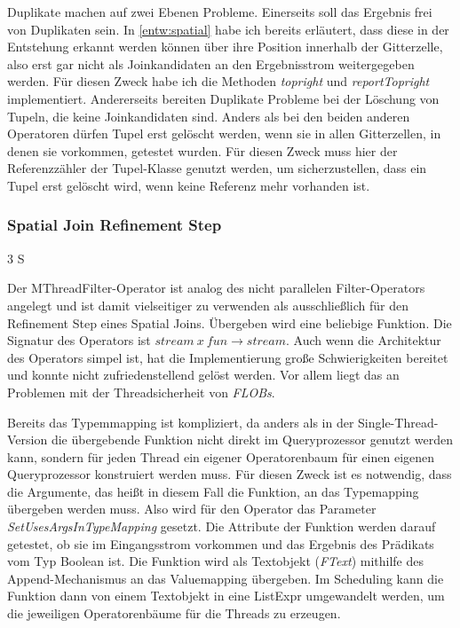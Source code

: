 \documentclass[a4paper,12pt,twoside]{article}
\newcommand{\Fb}[1]{\textit{#1}} %
\begin{document}
{Duplikate machen auf zwei Ebenen Probleme. Einerseits soll das Ergebnis frei von Duplikaten sein. In \autoref{entw:spatial} habe ich bereits erläutert, dass diese in der Entstehung erkannt werden können über ihre Position innerhalb der Gitterzelle, also erst gar nicht als Joinkandidaten an den Ergebnisstrom weitergegeben werden. Für diesen Zweck habe ich die Methoden \Fb{topright} und \Fb{reportTopright} implementiert. Andererseits bereiten Duplikate Probleme bei der Löschung von Tupeln, die keine Joinkandidaten sind. Anders als bei den beiden anderen Operatoren dürfen Tupel erst gelöscht werden, wenn sie in allen Gitterzellen, in denen sie vorkommen, getestet wurden. Für diesen Zweck muss hier der Referenzzähler der Tupel-Klasse genutzt werden, um sicherzustellen, dass ein Tupel erst gelöscht wird, wenn keine Referenz mehr vorhanden ist.

\subsubsection{Spatial Join Refinement Step} 3 S
\label{impl:refinement}

Der MThreadFilter-Operator ist analog des nicht parallelen Filter-Operators angelegt und ist damit vielseitiger zu verwenden als ausschließlich für den Refinement Step eines Spatial Joins. Übergeben wird eine beliebige Funktion. Die Signatur des Operators ist $stream~x~fun \longrightarrow stream$. Auch wenn die Architektur des Operators simpel ist, hat die Implementierung große Schwierigkeiten bereitet und konnte nicht zufriedenstellend gelöst werden. Vor allem liegt das an Problemen mit der Threadsicherheit von \Fb{FLOBs}.

Bereits das Typemmapping ist kompliziert, da anders als in der Single-Thread-Version die übergebende Funktion nicht direkt im Queryprozessor genutzt werden kann, sondern für jeden Thread ein eigener Operatorenbaum für einen eigenen Queryprozessor konstruiert werden muss. Für diesen Zweck ist es notwendig, dass die Argumente, das heißt in diesem Fall die Funktion, an das Typemapping übergeben werden muss. Also wird für den Operator das Parameter \Fb{SetUsesArgsInTypeMapping} gesetzt. Die Attribute der Funktion werden darauf getestet, ob sie im Eingangsstrom vorkommen und das Ergebnis des Prädikats vom Typ Boolean ist. Die Funktion wird als Textobjekt (\Fb{FText}) mithilfe des Append-Mechanismus an das Valuemapping übergeben. Im Scheduling kann die Funktion dann von einem Textobjekt in eine ListExpr umgewandelt werden, um die jeweiligen Operatorenbäume für die Threads zu erzeugen.

}
\end{document}
